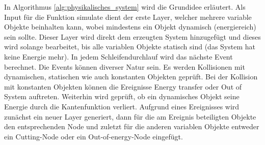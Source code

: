 In Algorithmus \ref{alg:physikalisches_system} wird die Grundidee erläutert. Als Input für die Funktion \glqq simulate\grqq{}
dient der erste Layer, welcher mehrere variable Objekte beinhalten kann, wobei mindestens ein Objekt dynamisch (energiereich)
sein sollte. Dieser Layer wird direkt dem erzeugten System hinzugefügt und dieses wird solange bearbeitet, bis alle variablen
Objekte statisch sind (das System hat keine Energie mehr). In jedem Schleifendurchlauf wird das nächste Event berechnet.
Die Events können diverser Natur sein. Es werden Kollisionen mit dynamischen, statischen wie auch konstanten Objekten
geprüft. Bei der Kollision mit konstanten Objekten können die Ereignisse \glqq Energy transfer\grqq{} oder \glqq Out of
System\grqq{} auftreten. Weiterhin wird geprüft, ob ein dynamisches Objekt seine Energie durch die Kantenfunktion
verliert.
Aufgrund eines Ereignisses wird zunächst ein neuer Layer generiert, dann für die am Ereignis beteiligten Objekte
den entsprechenden Node und zuletzt für die anderen variablen Objekte entweder ein \glqq Cutting-Node\grqq{} oder ein
\glqq Out-of-energy-Node\grqq{} eingefügt.

